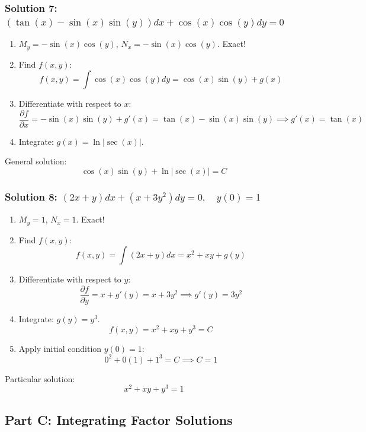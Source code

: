 \documentclass[11pt,letterpaper]{article}
\begin{document}
\subsubsection*{Solution 7: $\left(\tan(x) - \sin(x)\sin(y)\right)dx + \cos(x)\cos(y)dy = 0$}
\begin{enumerate}
    \item $M_y = -\sin(x)\cos(y)$, $N_x = -\sin(x)\cos(y)$. Exact!
    \item Find $f(x,y)$:
    \[ f(x,y) = \int \cos(x)\cos(y) dy = \cos(x)\sin(y) + g(x) \]
    \item Differentiate with respect to $x$:
    \[ \frac{\partial f}{\partial x} = -\sin(x)\sin(y) + g'(x) = \tan(x) - \sin(x)\sin(y) \implies g'(x) = \tan(x) \]
    \item Integrate: $g(x) = \ln|\sec(x)|$.
\end{enumerate}
General solution:
\[ \cos(x)\sin(y) + \ln|\sec(x)| = C \]

\subsubsection*{Solution 8: $(2x + y)dx + (x + 3y^2)dy = 0, \quad y(0) = 1$}
\begin{enumerate}
    \item $M_y = 1$, $N_x = 1$. Exact!
    \item Find $f(x,y)$:
    \[ f(x,y) = \int (2x+y)dx = x^2 + xy + g(y) \]
    \item Differentiate with respect to $y$:
    \[ \frac{\partial f}{\partial y} = x + g'(y) = x + 3y^2 \implies g'(y) = 3y^2 \]
    \item Integrate: $g(y) = y^3$.
    \[ f(x,y) = x^2 + xy + y^3 = C \]
    \item Apply initial condition $y(0) = 1$:
    \[ 0^2 + 0(1) + 1^3 = C \implies C = 1 \]
\end{enumerate}
Particular solution:
\[ x^2 + xy + y^3 = 1 \]

\subsection*{Part C: Integrating Factor Solutions}
\end{document}
